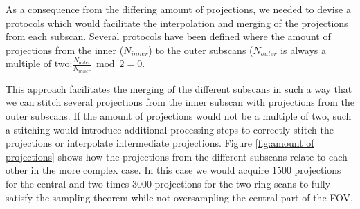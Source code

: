 As a consequence from the differing amount of projections, we needed to devise a protocols which would facilitate the interpolation and merging of the projections from each subscan. Several protocols have been defined where the amount of projections from the inner ($N_{inner}$) to the outer subscans ($N_{outer}$ is always a multiple of two:$\frac{N_{outer}}{N_{inner}} \bmod 2 = 0$.

This approach facilitates the merging of the different subscans in such a way that we can stitch several projections from the inner subscan with projections from the outer subscans. If the amount of projections would not be a multiple of two, such a stitching would introduce additional processing steps to correctly stitch the projections or interpolate intermediate projections. \cbend Figure \ref{fig:amount of projections} shows how the projections from the different subscans relate to each other in the more complex case. In this case we would acquire 1500 projections for the central and two times 3000 projections for the two ring-scans to fully satisfy the sampling theorem while not oversampling the central part of the FOV. 

\begin{figure*}
	\centering
	\caption[Number of merged projections for one central- and two ring-scan.]{Number of merged projections for one central- and two ring-scan. We assume that we have obtained 1500 projections for the central scan and thus acquire two times 1500 projections for each of the lateral scans. This enables us to stitch the projections $P_{1_{284}}$ %
 		(red line) from subscan 1 (ring scan, red area), projection $P_{2_{142}}$ %
 		(green line) from subscan 2 (central scan, green area) and projection $P_{3_{283}}$ %
 		(blue line) of subscan 3 (ring scan, blue area) to one big projection $P_{merge_{284}}$ %
		which covers the full FOV. The areas of the three subscans overlap slightly as described above to account for variations in positioning. For illustration purposes we shifted the central projection (green) by \SI{2}{\degree}, otherwise the overlap between these particular projection would not be visible.}%
	\label{fig:amount of projections}%
\end{figure*}

\cbstart
